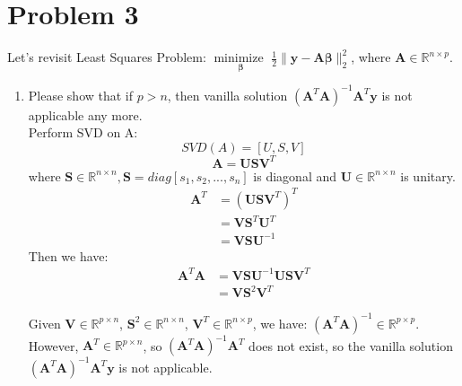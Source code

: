 \documentclass[11pt]{article}
\newcommand{\R}{\mathbb{R}}
\newcommand{\minimize}{\operatorname*{minimize\ }}
\newcommand{\mtx}[1]{\mathbf{#1}}
\newcommand{\vct}[1]{\mathbf{#1}}
\def \mA {\mtx{A}}
\def \mU {\mtx{U}}
\def \mS {\mtx{S}}
\def \mV {\mtx{V}}
\def \vy {\vct{y}}
\def \R {\mathbb{R}}
\begin{document}
\vspace{4cm}
	
	\section*{Problem 3}
	Let's revisit Least Squares Problem: $\minimize \limits_{\bm{\beta}} \frac{1}{2}\|\vy-\mA\bm{\beta}\|^2_2$, where $\mA\in\R^{n\times p}$.
	\begin{enumerate}
		\item Please show that if $p>n$, then vanilla solution $(\mA^T\mA)^{-1}\mA^T\vy$ is not applicable any more.	\\
		Perform SVD on A:
		\begin{equation}
			SVD(A)=[U,S,V]
		\end{equation}
	\begin{equation}
		\mA=\mU\mS\mV^T
	\end{equation}
where $\mS\in\R^{n\times n}, \mS=diag[s_1,s_2,...,s_n]$ is diagonal and $\mU\in\R^{n\times n}$ is unitary.
	\begin{equation}
		\begin{aligned}
			\mA^T &= (\mU\mS\mV^T)^T\\
			&= \mV\mS^T\mU^T\\
			&= \mV\mS\mU^{-1}
		\end{aligned}
	\end{equation}
	Then we have:
	\begin{equation}
		\begin{aligned}
			\mA^T\mA &= \mV\mS\mU^{-1}\mU\mS\mV^T\\
			&= \mV\mS^2\mV^T 
		\end{aligned}
	\end{equation}

		Given $\mV\in\R^{p\times n}$, $\mS^2\in\R^{n\times n}$, $\mV^T\in\R^{n\times p}$, we have:  $(\mA^T\mA)^{-1} \in\R^{p \times p}$. However, $\mA^T\in\R^{p\times n}$, so $(\mA^T\mA)^{-1}\mA^T$ does not exist, so the vanilla solution $(\mA^T\mA)^{-1}\mA^T\vy$ is not applicable.
		

\end{enumerate}
\end{document}
